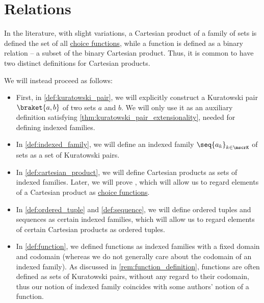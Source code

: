 \section{Relations}\label{sec:relations}

\begin{remark}\label{rem:cartesian_products_and_functions}
  In the literature, with slight variations, a Cartesian product of a family of sets is defined the set of all \hyperref[def:choice_function]{choice functions}, while a function is defined as a binary relation -- a subset of the binary Cartesian product. Thus, it is common to have two distinct definitions for Cartesian products.

  We will instead proceed as follows:
  \begin{itemize}
    \item First, in \cref{def:kuratowski_pair}, we will explicitly construct a Kuratowski pair \( \braket{ a, b } \) of two sets \( a \) and \( b \). We will only use it as an auxiliary definition satisfying \cref{thm:kuratowski_pair_extensionality}, needed for defining indexed families.

    \item In \cref{def:indexed_family}, we will define an indexed family \( \seq{ a_k }_{k \in \mscrK} \) of sets as a set of Kuratowski pairs.

    \item In \cref{def:cartesian_product}, we will define Cartesian products as sets of indexed families. Later, we will prove , which will allow us to regard elements of a Cartesian product as \hyperref[def:choice_function]{choice functions}.

    \item In \cref{def:ordered_tuple} and \cref{def:sequence}, we will define ordered tuples and sequences as certain indexed families, which will allow us to regard elements of certain Cartesian products as ordered tuples.

    \item In \cref{def:function}, we defined functions as indexed families with a fixed domain and codomain (whereas we do not generally care about the codomain of an indexed family). As discussed in \cref{rem:function_definition}, functions are often defined as sets of Kuratowski pairs, without any regard to their codomain, thus our notion of indexed family coincides with some authors' notion of a function.
  \end{itemize}


\end{remark}
